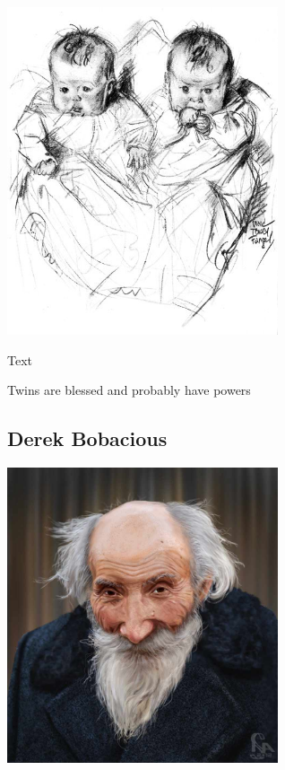 \begin{center}
\includegraphics[width=80mm]{./content/img/twins.jpg}
\begin{figure}[h]
\end{figure}
\end{center}

\noindent 

Text

Twins are blessed and probably have powers

\smallskip

\subsection*{Derek Bobacious} 

\begin{center}
\includegraphics[width=80mm]{./content/img/derek.png}
\begin{figure}[h]
\end{figure}
\end{center}

